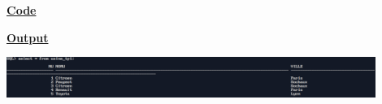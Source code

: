 \newpage
{}

\textbf{\underline{Code}}


\vspace{1cm}
\textbf{\underline{Output}}
\vspace{1cm}
\begin{center}
    \includegraphics[width=0.9\textwidth]{Questions/q8/q8.png}
\end{center}



